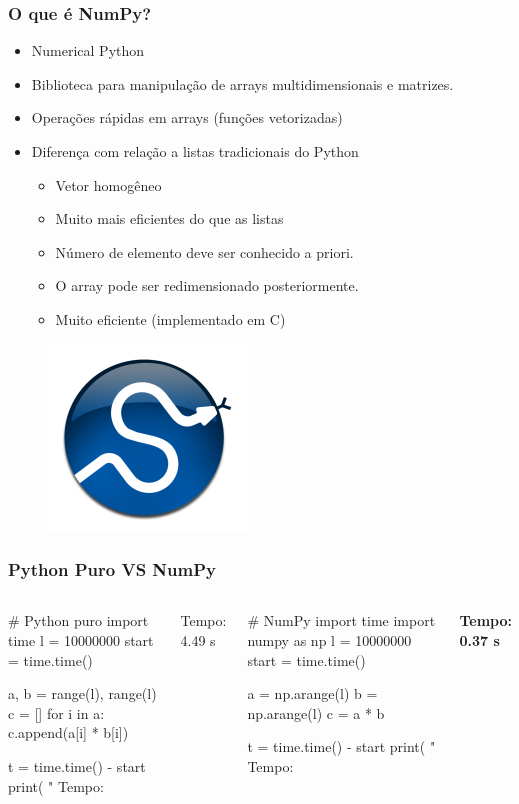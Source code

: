\documentclass[12pt,t,graphics]{beamer}
\newcommand{\ft}[1]{\frametitle{#1}}
\newcommand{\bi}{\begin{itemize}}
\newcommand{\ei}{\end{itemize}}
\begin{document}
\begin{frame}[fragile]
  \ft{O que é NumPy?}
  \bi
\item Numerical Python
\item Biblioteca para manipulação de arrays
  multidimensionais e matrizes.
\item Operações rápidas em arrays (funções
  vetorizadas)
\item Diferença com relação a listas tradicionais do Python
  \bi
\item Vetor homogêneo
\item Muito mais eficientes do que as listas
\item Número de elemento deve ser conhecido a priori.
\item O array pode ser redimensionado posteriormente.
\item Muito eficiente (implementado em C)
  \ei
  \ei
  \begin{figure}
    \centering
    \includegraphics[scale=0.4]{img/numpy}
    \label{fig:numpy}
  \end{figure}
\end{frame}


\begin{frame}[fragile]
  \ft{Python Puro VS NumPy}
  \begin{columns}
	\begin{python}
# Python puro
import time
l = 10000000
start = time.time()

a, b = range(l), range(l)
c = []
for i in a:
    c.append(a[i] * b[i])

t = time.time() - start
print( " Tempo: %
	\end{python}
	Tempo: 4.49 s
	\begin{python}
# NumPy
import time
import numpy as np
l = 10000000
start = time.time()

a = np.arange(l)
b = np.arange(l)
c = a * b

t = time.time() - start
print( " Tempo: %
	\end{python}
	\textbf{Tempo: 0.37 s}
  \end{columns}
\end{frame}
\end{document}

